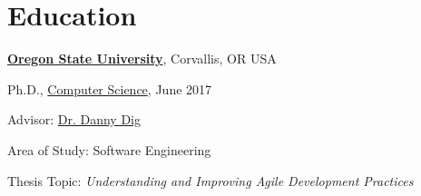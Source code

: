 \documentclass[10pt]{article}
\begin{document}
%



\vspace{-5pt}

\section{Education}

\href{http://www.oregonstate.edu/}{\textbf{Oregon State University}},  Corvallis, OR USA


\begin{outerlist}

\item[] Ph.D.,
        \href{http://eecs.oregonstate.edu/}
             {Computer Science},
             June 2017
        \begin{innerlist}
        \item Advisor:
              \href{http://dig.cs.illinois.edu/}
                   {Dr. Danny Dig}
        \item Area of Study: Software Engineering 
        \item Thesis Topic: \emph{Understanding and Improving Agile Development Practices}

        \end{innerlist}
\end{outerlist}
\vspace{.5\baselineskip}
\end{document}
